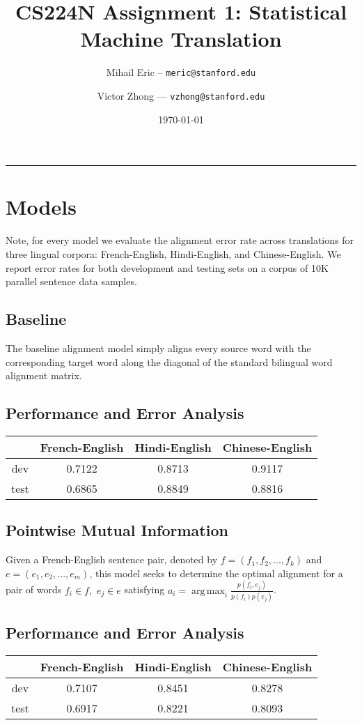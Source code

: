 \documentclass[12pt]{article}
\title{CS224N Assignment 1: Statistical Machine Translation}
\author{Mihail Eric -- \texttt{meric@stanford.edu}
		\and 
		Victor Zhong --- \texttt{vzhong@stanford.edu}
}
\date{\today}
\DeclareMathOperator*{\argmax}{arg\,max}
\begin{document}
  \maketitle

  \vspace{-0.3in}
  \rule{\linewidth}{0.4pt}

 

 \section*{Models}
 	Note, for every model we evaluate the alignment error rate 
 	across translations	for three lingual corpora: French-English, Hindi-English,
 	and Chinese-English. We report error rates for both development and 
 	testing sets on a corpus of 10K parallel sentence data samples.

 \subsection*{Baseline}
 	The baseline alignment model simply aligns every source word with the 
 	corresponding target word along the diagonal of the standard bilingual 
 	word alignment matrix. 
 \subsection*{Performance and Error Analysis}
 	\begin{center}
	 \begin{tabular}{*{4}{c}}
	 	\hline
	 	 & French-English & Hindi-English & Chinese-English  \\
	 	\hline
	 	dev & 0.7122 & 0.8713 & 0.9117 \\
	 	\hline
	 	test & 0.6865 & 0.8849 & 0.8816 
	 \end{tabular}
	 \end{center}	
 \subsection*{Pointwise Mutual Information}
 	Given a French-English sentence pair, denoted by $f=(f_1,f_2,...,f_k)$
 	and $e=(e_1,e_2,...,e_m)$, this model seeks to determine the optimal 
 	alignment for a pair of words $f_i\in f, $ $e_j\in e$ satisfying 
 	$a_i = \argmax_{i} \frac{p(f_i,e_j)}{p(f_i)p(e_j)}$.
 \subsection*{Performance and Error Analysis}
 	\begin{center}
	 \begin{tabular}{*{4}{c}}
	 	\hline
	 	 & French-English & Hindi-English & Chinese-English  \\
	 	\hline
	 	dev & 0.7107 & 0.8451 & 0.8278 \\
	 	\hline
	 	test & 0.6917 & 0.8221 & 0.8093 
	 \end{tabular}
	 \end{center}
\end{document}
